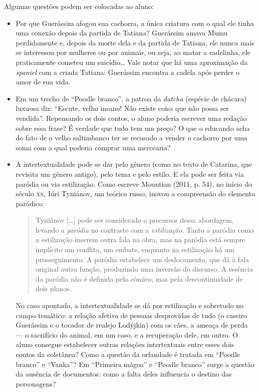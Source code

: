 \documentclass[11pt]{extarticle}
\begin{document}
Algumas questões podem ser colocadas ao aluno:

\begin{itemize}
\item Por que Guerássim afogou sua cachorra, a única criatura com o qual ele
tinha uma conexão depois da partida de Tatiana? Guerássim amava Mumu
perdidamente e, depois da morte dela e da partida de Tatiana, ele nunca
mais se interessou por mulheres ou por animais, ou seja, ao matar a
cadelinha, ele praticamente cometeu um suicídio\ldots{} Vale notar que há uma
aproximação da \emph{spaniel} com a criada Tatiana: Guerássim encontra a
cadela após perder o amor de sua vida.

\item Em um trecho de ``Poodle branco'', a patroa da \emph{datcha}
(espécie de chácara) luxuosa diz: ``Escute, velho insano! Não existe
coisa que não possa ser vendida''. Repensando os dois contos, o aluno
poderia escrever uma redação sobre essa frase? É verdade que tudo tem um
preço? O que o educando acha do fato de o velho saltimbanco ter se
recusado a vender o cachorro por uma soma com a qual poderia comprar uma
mercearia?

\item A intertextualidade pode se dar pelo gênero (como no texto de
Catarina, que revisita um gênero antigo), pelo tema e pelo estilo. E ela
pode ser feita via paródia ou via estilização. Como escreve Mountian
(2011, p. 54), no início do século \textsc{xx}, Iúri Tyniánov, um teórico russo,
inovou a compreensão do elemento paródico:

\begin{quote}
Tyniánov {[}\ldots{}{]} pode ser considerado o precursor dessa abordagem,
levando a \emph{paródia} no contraste com a \emph{estilização}. Tanto a
paródia como a estilização inserem outra fala na obra, mas na paródia
está sempre implícito um conflito, um embate, enquanto na estilização há
um prosseguimento. A paródia estabelece um deslocamento, que dá à fala
original outra função, produzindo uma inversão do discurso. A essência
da paródia não é definida pelo cômico, mas pela descontinuidade de dois
planos.
\end{quote}

No caso apontado, a intertextualidade se dá por estilização e sobretudo
no campo temático: a relação afetiva de pessoas desprovidas de tudo (o
caseiro Guerássim e o tocador de realejo Lodýjkin) com os cães, a ameaça
de perda --- o sacrifício do animal, em um caso, e a recuperação dele,
em outro. O aluno consegue estabelecer outras relações intertextuais
entre esses dois contos da coletânea? Como a questão da orfandade é
tratada em ``Poodle branco'' e ``Vanka''? Em ``Primeira mágoa'' e
``Poodle branco'' surge a questão da ausência de documentos: como a
falta deles influencia o destino das personagens?
\end{itemize}
\end{document}
